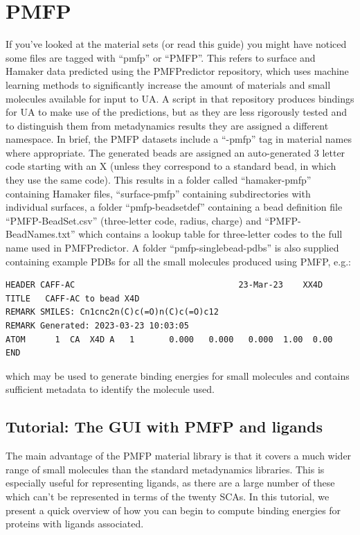 \documentclass[10pt,a4paper,onecolumn]{report}
\begin{document}
\section{PMFP} \label{section:pmfp}
If you've looked at the material sets (or read this guide) you might have noticed some files are tagged with ``pmfp'' or ``PMFP''. This refers to surface and Hamaker data predicted using the PMFPredictor repository, which uses machine learning methods to significantly increase the amount of materials and small molecules available for input to UA. A script in that repository produces bindings for UA to make use of the predictions, but as they are less rigorously tested and to distinguish them from metadynamics results they are assigned a different namespace. In brief, the PMFP datasets include a ``-pmfp'' tag in material names where appropriate. The generated beads are assigned an auto-generated 3 letter code starting with an X (unless they correspond to a standard bead, in which they use the same code). This results in a folder called ``hamaker-pmfp'' containing Hamaker files, ``surface-pmfp'' containing subdirectories with individual surfaces, a folder ``pmfp-beadsetdef'' containing a bead definition file ``PMFP-BeadSet.csv'' (three-letter code, radius, charge) and ``PMFP-BeadNames.txt'' which contains a lookup table for three-letter codes to the full name used in PMFPredictor. A folder ``pmfp-singlebead-pdbs'' is also supplied containing example PDBs for all the small molecules produced using PMFP, e.g.:
\begin{lstlisting}
HEADER CAFF-AC                                 23-Mar-23    XX4D
TITLE   CAFF-AC to bead X4D
REMARK SMILES: Cn1cnc2n(C)c(=O)n(C)c(=O)c12
REMARK Generated: 2023-03-23 10:03:05
ATOM      1  CA  X4D A   1       0.000   0.000   0.000  1.00  0.00
END
\end{lstlisting}
which may be used to generate binding energies for small molecules and contains sufficient metadata to identify the molecule used. 
 

\subsection{Tutorial: The GUI  with PMFP and ligands} \label{section:ligandtutorial}
The main advantage of the PMFP material library is that it covers a much wider range of small molecules than the standard metadynamics libraries. This is especially useful for representing ligands, as there are a large number of these which can't be represented in terms of the twenty SCAs.  In this tutorial, we present a quick overview of how you can begin to compute binding energies for proteins with ligands associated. 
\end{document}
